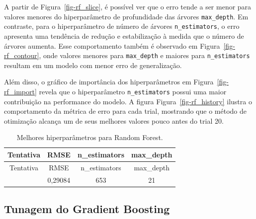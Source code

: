 \documentclass[
  12pt,
  a4paper,
]{scrreprt}
\begin{document}
\vspace{12pt}

A partir de Figura~\ref{fig-rf_slice}, é possível ver que o erro tende a
ser menor para valores menores do hiperparâmetro de profundidade das
árvores \texttt{max\_depth}. Em contraste, para o hiperparâmetro de
número de árvores \texttt{n\_estimators}, o erro apresenta uma tendência
de redução e estabilização à medida que o número de árvores aumenta.
Esse comportamento também é observado em Figura~\ref{fig-rf_contour},
onde valores menores para \texttt{max\_depth} e maiores para
\texttt{n\_estimators} resultam em um modelo com menor erro de
generalização.

\vspace{12pt}

Além disso, o gráfico de importância dos hiperparâmetros em
Figura~\ref{fig-rf_import} revela que o hiperparâmetro
\texttt{n\_estimators} possui uma maior contribuição na performance do
modelo. A figura Figura~\ref{fig-rf_history} ilustra o comportamento da
métrica de erro para cada trial, mostrando que o método de otimização
alcança um de seus melhores valores pouco antes do trial 20.

\begin{longtable}[]{@{}cccc@{}}
\caption{Melhores hiperparâmetros para Random
Forest.}\label{tbl-params_rf}\tabularnewline
\toprule\noalign{}
Tentativa & RMSE & n\_estimators & max\_depth \\
\midrule\noalign{}
\endfirsthead
\toprule\noalign{}
Tentativa & RMSE & n\_estimators & max\_depth \\
\midrule\noalign{}
\endhead
\bottomrule\noalign{}
\endlastfoot
62 & 0,29084 & 653 & 21 \\
\end{longtable}

\subsection{Tunagem do Gradient
Boosting}\label{tunagem-do-gradient-boosting}
\end{document}
